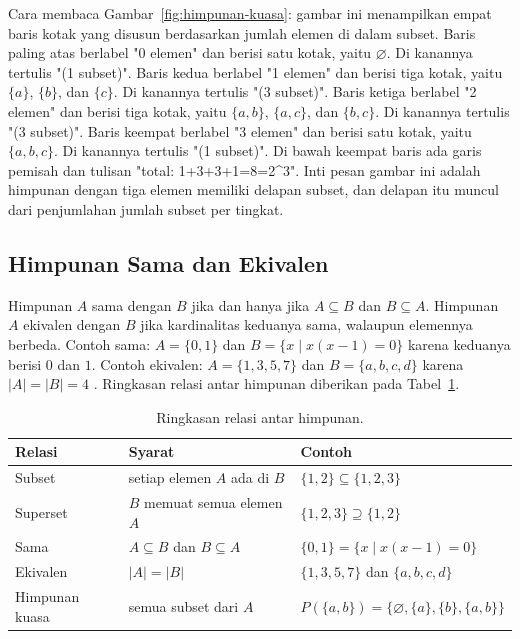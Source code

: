 \documentclass[11pt,a4paper]{article}
\begin{document}
Cara membaca Gambar~\ref{fig:himpunan-kuasa}: gambar ini menampilkan empat baris kotak yang disusun berdasarkan jumlah elemen di dalam subset. Baris paling atas berlabel "0 elemen" dan berisi satu kotak, yaitu $\varnothing$. Di kanannya tertulis "(1 subset)". Baris kedua berlabel "1 elemen" dan berisi tiga kotak, yaitu $\{a\}$, $\{b\}$, dan $\{c\}$. Di kanannya tertulis "(3 subset)". Baris ketiga berlabel "2 elemen" dan berisi tiga kotak, yaitu $\{a,b\}$, $\{a,c\}$, dan $\{b,c\}$. Di kanannya tertulis "(3 subset)". Baris keempat berlabel "3 elemen" dan berisi satu kotak, yaitu $\{a,b,c\}$. Di kanannya tertulis "(1 subset)". Di bawah keempat baris ada garis pemisah dan tulisan "total: 1+3+3+1=8=2^3". Inti pesan gambar ini adalah himpunan dengan tiga elemen memiliki delapan subset, dan delapan itu muncul dari penjumlahan jumlah subset per tingkat.

\subsection{Himpunan Sama dan Ekivalen}

Himpunan $A$ sama dengan $B$ jika dan hanya jika $A \subseteq B$ dan $B \subseteq A$. Himpunan $A$ ekivalen dengan $B$ jika kardinalitas keduanya sama, walaupun elemennya berbeda. Contoh sama: $A=\{0,1\}$ dan $B=\{x \mid x(x-1)=0\}$ karena keduanya berisi $0$ dan $1$. Contoh ekivalen: $A=\{1,3,5,7\}$ dan $B=\{a,b,c,d\}$ karena $|A|=|B|=4$ \cite{rosen}. Ringkasan relasi antar himpunan diberikan pada Tabel~\ref{tab:relasi-himpunan}.

\begin{table}[H]
	\centering
	\caption{Ringkasan relasi antar himpunan.}
	\label{tab:relasi-himpunan}
	\small
	\begin{tabularx}{\textwidth}{l X X}
		\toprule
		Relasi         & Syarat                              & Contoh                                           \\
		\midrule
		Subset         & setiap elemen $A$ ada di $B$        & $\{1,2\} \subseteq \{1,2,3\}$                    \\
		Superset       & $B$ memuat semua elemen $A$         & $\{1,2,3\} \supseteq \{1,2\}$                    \\
		Sama           & $A \subseteq B$ dan $B \subseteq A$ & $\{0,1\}=\{x \mid x(x-1)=0\}$                    \\
		Ekivalen       & $|A|=|B|$                           & $\{1,3,5,7\}$ dan $\{a,b,c,d\}$                  \\
		Himpunan kuasa & semua subset dari $A$               & $P(\{a,b\})=\{\varnothing,\{a\},\{b\},\{a,b\}\}$ \\
		\bottomrule
	\end{tabularx}
\end{table}
\end{document}
